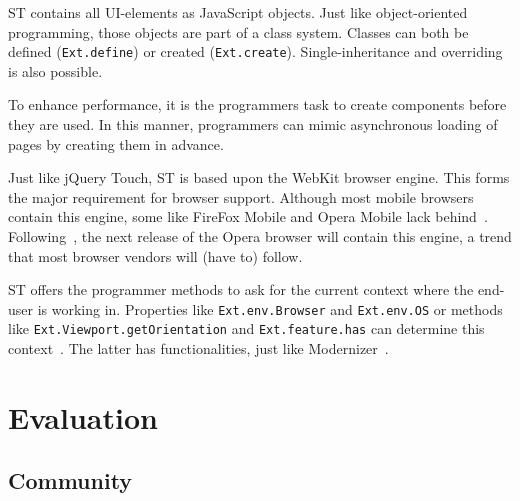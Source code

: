 \documentclass[a4paper]{artikel3}
\newcommand{\code}[1]{\texttt{#1}}
\renewcommand{\paragraph}[1]{\vspace{2mm} \noindent {\bf #1}  }
\begin{document}
ST contains all UI-elements as JavaScript objects.  Just like object-oriented programming,  those objects are part of a class system.  Classes can both be defined (\code{Ext.define}) or created (\code{Ext.create}).  Single-inheritance and overriding is also possible.    

To enhance performance,  it is the programmers task to create components before they are used.  In this manner,  programmers can mimic asynchronous loading of pages by creating them in advance.



\paragraph{Browser support}
Just like jQuery Touch,  ST is based upon the WebKit browser engine.  This forms the major requirement for browser support.  Although most mobile browsers contain this engine,  some like FireFox Mobile and Opera Mobile lack behind~\cite{JohnEClark2012}.  Following~\cite{Wokke2013}, the next release of the Opera browser will contain this engine,  a trend that most browser vendors will (have to) follow.

ST offers the programmer methods to ask for the current context where the end-user is working in.  Properties like \code{Ext.env.Browser} and \code{Ext.env.OS} or methods like \code{Ext.Viewport.getOrientation} and \code{Ext.feature.has} can determine this context~\cite{JohnEClark2012}.  The latter has functionalities,  just like Modernizer~\cite{Modernizr2012}.  


\section{Evaluation}

\subsection{Community} %
\label{sec:community}


\end{document}
